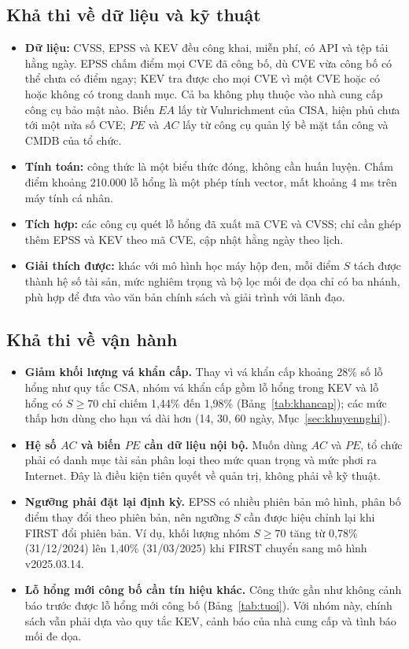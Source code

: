 \documentclass[runningheads]{llncs}
\begin{document}
\subsection{Khả thi về dữ liệu và kỹ thuật}
\begin{itemize}
\item \textbf{Dữ liệu:} CVSS, EPSS và KEV đều công khai, miễn phí, có API và tệp tải hằng
ngày. EPSS chấm điểm mọi CVE đã công bố, dù CVE vừa công bố có thể chưa có điểm ngay; KEV tra được cho mọi CVE vì một CVE hoặc có hoặc không
có trong danh mục. Cả ba không phụ thuộc vào nhà cung cấp công cụ bảo mật nào. Biến $\mathit{EA}$ lấy từ Vulnrichment của CISA, hiện phủ chưa tới một nửa số CVE; $\mathit{PE}$ và $AC$ lấy từ công cụ quản lý bề mặt tấn công và CMDB của tổ chức.
\item \textbf{Tính toán:} công thức là một biểu thức đóng, không cần huấn luyện. Chấm điểm
khoảng 210.000 lỗ hổng là một phép tính vector, mất khoảng 4 ms trên máy tính cá nhân.
\item \textbf{Tích hợp:} các công cụ quét lỗ hổng đã xuất mã CVE và CVSS; chỉ cần ghép thêm
EPSS và KEV theo mã CVE, cập nhật hằng ngày theo lịch.
\item \textbf{Giải thích được:} khác với mô hình học máy hộp đen, mỗi điểm $S$ tách được thành
hệ số tài sản, mức nghiêm trọng và bộ lọc mối đe dọa chỉ có ba nhánh, phù hợp để đưa vào văn bản chính sách và giải trình với lãnh đạo.
\end{itemize}

\subsection{Khả thi về vận hành}
\begin{itemize}
\item \textbf{Giảm khối lượng vá khẩn cấp.} Thay vì vá khẩn cấp khoảng 28\% số lỗ hổng như
quy tắc CSA, nhóm vá khẩn cấp gồm lỗ hổng trong KEV và lỗ hổng có $S \ge 70$ chỉ chiếm
1,44\% đến 1,98\% (Bảng~\ref{tab:khancap}); các mức thấp hơn dùng cho hạn vá dài hơn (14, 30, 60 ngày, Mục~\ref{sec:khuyennghi}).
\item \textbf{Hệ số $AC$ và biến $\mathit{PE}$ cần dữ liệu nội bộ.} Muốn dùng $AC$ và $\mathit{PE}$, tổ chức phải có danh mục tài
sản phân loại theo mức quan trọng và mức phơi ra Internet. Đây là điều kiện tiên quyết về
quản trị, không phải về kỹ thuật.
\item \textbf{Ngưỡng phải đặt lại định kỳ.} EPSS có nhiều phiên bản mô hình, phân bố điểm
thay đổi theo phiên bản, nên ngưỡng $S$ cần được hiệu chỉnh lại khi FIRST đổi phiên bản. Ví dụ, khối
lượng nhóm $S \ge 70$ tăng từ 0,78\% (31/12/2024) lên 1,40\% (31/03/2025) khi FIRST chuyển sang mô
hình v2025.03.14.
\item \textbf{Lỗ hổng mới công bố cần tín hiệu khác.} Công thức gần như không cảnh báo trước
được lỗ hổng mới công bố (Bảng~\ref{tab:tuoi}). Với nhóm này, chính sách vẫn phải dựa vào
quy tắc KEV, cảnh báo của nhà cung cấp và tình báo mối đe dọa.
\end{itemize}
\end{document}
